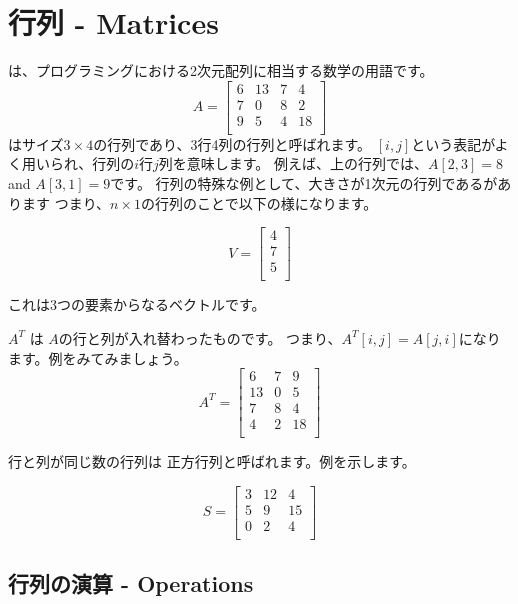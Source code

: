\chapter{行列 - Matrices}


 は、プログラミングにおける2次元配列に相当する数学の用語です。
\[
A =
 \begin{bmatrix}
  6 & 13 & 7 & 4 \\
  7 & 0 & 8 & 2 \\
  9 & 5 & 4 & 18 \\
 \end{bmatrix}
\]
はサイズ$3 \times 4$の行列であり、3行4列の行列と呼ばれます。
$[i, j]$という表記がよく用いられ、行列の$i$行$j$列を意味します。
例えば、上の行列では、$A[2,3]=8$ and $A[3,1]=9$です。
行列の特殊な例として、大きさが1次元の行列であるがあります
つまり、$n \times 1$の行列のことで以下の様になります。

\[
V =
\begin{bmatrix}
4 \\
7 \\
5 \\
\end{bmatrix}
\]

これは3つの要素からなるベクトルです。


 $A^T$ は $A$の行と列が入れ替わったものです。
つまり、$A^T[i,j]=A[j,i]$になります。例をみてみましょう。
\[
A^T =
 \begin{bmatrix}
  6 & 7 & 9 \\
  13 & 0 & 5 \\
  7 & 8 & 4 \\
  4 & 2 & 18 \\
 \end{bmatrix}
\]


行と列が同じ数の行列は
正方行列と呼ばれます。例を示します。

\[
S =
 \begin{bmatrix}
  3 & 12 & 4  \\
  5 & 9 & 15  \\
  0 & 2 & 4 \\
 \end{bmatrix}
\]

\section{行列の演算 - Operations}

